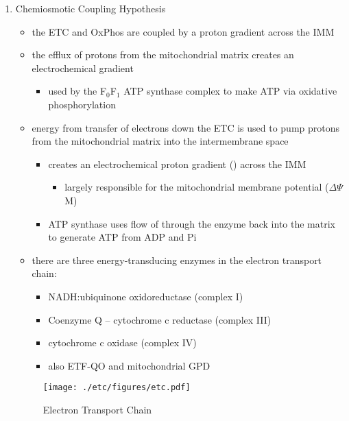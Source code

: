 \documentclass{scrartcl}
\begin{document}
\begin{enumerate}
\item Chemiosmotic Coupling Hypothesis
\label{sec:orgf3dc28d}
\begin{itemize}
\item the ETC and OxPhos are coupled by a proton gradient across the IMM
\item the efflux of protons from the mitochondrial matrix creates an electrochemical gradient
\begin{itemize}
\item used by the F\(_{\text{0}}\)F\(_{\text{1}}\) ATP synthase complex to make ATP via oxidative phosphorylation
\end{itemize}
\end{itemize}
\begin{itemize}
\item energy from transfer of electrons down the ETC is used to pump
protons from the mitochondrial matrix into the intermembrane space
\begin{itemize}
\item creates an electrochemical proton gradient (\DeltapH) across the IMM
\begin{itemize}
\item largely responsible for the mitochondrial membrane potential (\(\Delta \Psi\)M)
\end{itemize}
\item ATP synthase uses flow of  through the enzyme back into the
matrix to generate ATP from ADP and Pi
\end{itemize}
\item there are three energy-transducing enzymes in the electron transport
chain:
\begin{itemize}
\item NADH:ubiquinone oxidoreductase (complex I)
\item Coenzyme Q – cytochrome c reductase (complex III)
\item cytochrome c oxidase (complex IV)
\item also ETF-QO and mitochondrial GPD
\end{itemize}
\end{itemize}

\begin{figure}[htbp]
\centering
\texttt{[image: ./etc/figures/etc.pdf]}
\caption{\label{fig:org63bb552}
Electron Transport Chain}
\end{figure}


\end{enumerate}
\end{document}
